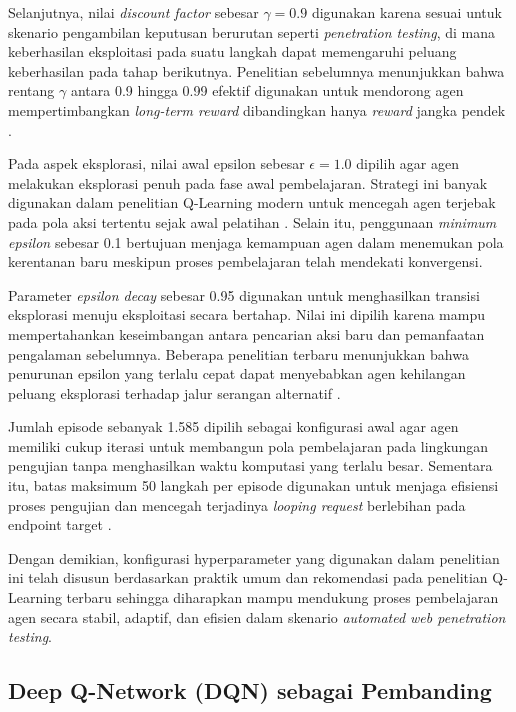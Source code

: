 Selanjutnya, nilai \textit{discount factor} sebesar $\gamma = 0.9$ digunakan karena sesuai untuk skenario pengambilan keputusan berurutan seperti \textit{penetration testing}, di mana keberhasilan eksploitasi pada suatu langkah dapat memengaruhi peluang keberhasilan pada tahap berikutnya. Penelitian sebelumnya menunjukkan bahwa rentang $\gamma$ antara 0.9 hingga 0.99 efektif digunakan untuk mendorong agen mempertimbangkan \textit{long-term reward} dibandingkan hanya \textit{reward} jangka pendek \cite{liu2024hrl,yi2023drl}.

Pada aspek eksplorasi, nilai awal epsilon sebesar $\epsilon = 1.0$ dipilih agar agen melakukan eksplorasi penuh pada fase awal pembelajaran. Strategi ini banyak digunakan dalam penelitian Q-Learning modern untuk mencegah agen terjebak pada pola aksi tertentu sejak awal pelatihan \cite{becker2024evaluation,sensors2025rlpentest}. Selain itu, penggunaan \textit{minimum epsilon} sebesar 0.1 bertujuan menjaga kemampuan agen dalam menemukan pola kerentanan baru meskipun proses pembelajaran telah mendekati konvergensi.

Parameter \textit{epsilon decay} sebesar 0.95 digunakan untuk menghasilkan transisi eksplorasi menuju eksploitasi secara bertahap. Nilai ini dipilih karena mampu mempertahankan keseimbangan antara pencarian aksi baru dan pemanfaatan pengalaman sebelumnya. Beberapa penelitian terbaru menunjukkan bahwa penurunan epsilon yang terlalu cepat dapat menyebabkan agen kehilangan peluang eksplorasi terhadap jalur serangan alternatif \cite{sensors2025rlpentest,becker2024evaluation}.

Jumlah episode sebanyak 1.585 dipilih sebagai konfigurasi awal agar agen memiliki cukup iterasi untuk membangun pola pembelajaran pada lingkungan pengujian tanpa menghasilkan waktu komputasi yang terlalu besar. Sementara itu, batas maksimum 50 langkah per episode digunakan untuk menjaga efisiensi proses pengujian dan mencegah terjadinya \textit{looping request} berlebihan pada endpoint target \cite{ghanem2023hrl,yi2023drl}.

Dengan demikian, konfigurasi hyperparameter yang digunakan dalam penelitian ini telah disusun berdasarkan praktik umum dan rekomendasi pada penelitian Q-Learning terbaru sehingga diharapkan mampu mendukung proses pembelajaran agen secara stabil, adaptif, dan efisien dalam skenario \textit{automated web penetration testing}.

\subsection{Deep Q-Network (DQN) sebagai Pembanding}


